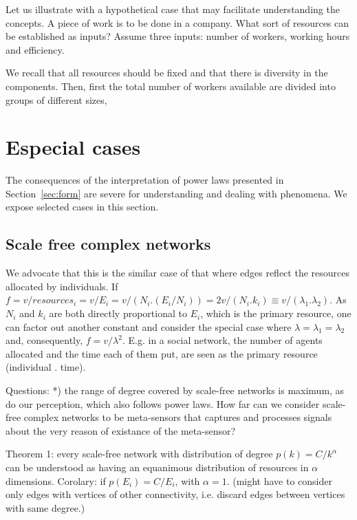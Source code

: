 \documentclass[a4paper, 11pt]{article} %
\begin{document}
Let us illustrate with a hypothetical case that may 
facilitate understanding the concepts.
A piece of work is to be done in a company.
What sort of resources can be established as inputs?
Assume three inputs:
number of workers, working hours and efficiency.


We recall that all resources should be fixed and that there is diversity in the components. 
Then, first the total number of workers available are divided into groups of different sizes,



%


\section{Especial cases}
The consequences of the
interpretation of power laws presented in Section~\ref{sec:form}
are severe for understanding and dealing with
phenomena. We expose selected cases in this section.


\subsection{Scale free complex networks}
We advocate that this is the similar case of that where edges reflect the resources allocated by individuals. If $f=v/resources_i=v/E_i=v/(N_i . (E_i/N_i))=2v/(N_i . k_i) \equiv v / (\lambda_1 .   \lambda_2)$. As $N_i$ and $k_i$ are both directly proportional to $E_i$, which is the primary resource, one can factor out another constant and consider the special case where $\lambda=\lambda_1=\lambda_2$ and, consequently, $f=v/\lambda^2$. E.g. in a social network, the number of agents allocated and the time each of them put, are seen as the primary resource (individual . time).

Questions:
*) the range of degree covered by scale-free networks is maximum, as do our perception, which also follows power laws. How far can we consider scale-free complex networks to be meta-sensors that captures and processes signals about the very reason of existance of the meta-sensor?

Theorem 1: every scale-free network with distribution of degree $p(k)=C/k^\alpha$ can be understood as having an equanimous distribution of resources in $\alpha$ dimensions.
Corolary: if $p(E_i)=C/E_i$, with $\alpha=1$. (might have to consider only edges with vertices of other connectivity, i.e. discard edges between vertices with same degree.)
\end{document}
